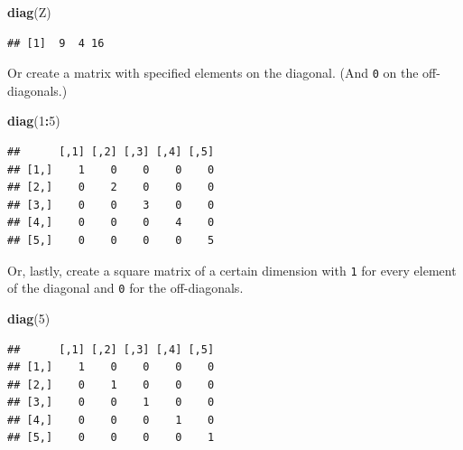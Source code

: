 \documentclass[]{book}
\newenvironment{Shaded}{\begin{snugshade}}{\end{snugshade}}
\newcommand{\KeywordTok}[1]{\textcolor[rgb]{0.13,0.29,0.53}{\textbf{#1}}}
\newcommand{\DecValTok}[1]{\textcolor[rgb]{0.00,0.00,0.81}{#1}}
\newcommand{\OperatorTok}[1]{\textcolor[rgb]{0.81,0.36,0.00}{\textbf{#1}}}
\newcommand{\NormalTok}[1]{#1}
\theoremstyle{definition}
\theoremstyle{definition}
\theoremstyle{definition}
\theoremstyle{remark}
\begin{document}
\begin{Shaded}
\begin{Highlighting}[]
\KeywordTok{diag}\NormalTok{(Z)}
\end{Highlighting}
\end{Shaded}

\begin{verbatim}
## [1]  9  4 16
\end{verbatim}

Or create a matrix with specified elements on the diagonal. (And
\texttt{0} on the off-diagonals.)

\begin{Shaded}
\begin{Highlighting}[]
\KeywordTok{diag}\NormalTok{(}\DecValTok{1}\OperatorTok{:}\DecValTok{5}\NormalTok{)}
\end{Highlighting}
\end{Shaded}

\begin{verbatim}
##      [,1] [,2] [,3] [,4] [,5]
## [1,]    1    0    0    0    0
## [2,]    0    2    0    0    0
## [3,]    0    0    3    0    0
## [4,]    0    0    0    4    0
## [5,]    0    0    0    0    5
\end{verbatim}

Or, lastly, create a square matrix of a certain dimension with
\texttt{1} for every element of the diagonal and \texttt{0} for the
off-diagonals.

\begin{Shaded}
\begin{Highlighting}[]
\KeywordTok{diag}\NormalTok{(}\DecValTok{5}\NormalTok{)}
\end{Highlighting}
\end{Shaded}

\begin{verbatim}
##      [,1] [,2] [,3] [,4] [,5]
## [1,]    1    0    0    0    0
## [2,]    0    1    0    0    0
## [3,]    0    0    1    0    0
## [4,]    0    0    0    1    0
## [5,]    0    0    0    0    1
\end{verbatim}


\end{document}
